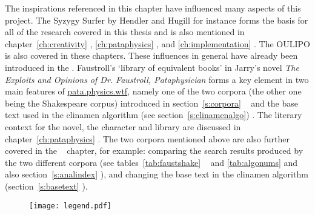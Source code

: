 The inspirations referenced in this chapter have influenced many aspects of this project. The Syzygy Surfer by Hendler and Hugill \autocite*{Hendler2011, Hendler2013} for instance forms the basis for all of the research covered in this thesis and is also mentioned in chapter~\ref{ch:creativity} \creat, \ref{ch:pataphysics} \pata, and \ref{ch:implementation} \imple. The \ac{OULIPO} is also covered in these chapters. These influences in general have already been introduced in the  \intro. Faustroll's `library of equivalent books' in Jarry's novel \textit{The Exploits and Opinions of Dr. Faustroll, Pataphysician} \autocite*{Jarry1996} forms a key element in two main features of \url{pata.physics.wtf}, namely one of the two corpora (the other one being the Shakespeare corpus) introduced in section~\ref{s:corpora} \imple~ and the base text used in the clinamen algorithm (see section~\ref{s:clinamenalgo}) \imple. The literary context for the novel, the character and library are discussed in chapter~\ref{ch:pataphysics} \pata. The two corpora mentioned above are also further covered in the  \anal~ chapter, for example: comparing the search results produced by the two different corpora (see tables~\ref{tab:faustshake} \anal~ and \ref{tab:algonums} and also section~\ref{s:analindex} \anal), and changing the base text in the clinamen algorithm (section~\ref{s:basetext} \anal).

\begin{figure}[!htb]
\centering
  \texttt{[image: legend.pdf]}
\end{figure}

\stopcontents[chapters]
